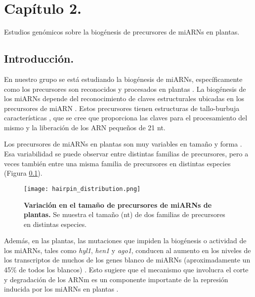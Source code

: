 
\graphicspath{{Chapter2/Figs/}}

\setcounter{chapter}{5}
\chapter*{Capítulo 2.} 
\setcounter{figure}{0}
\setcounter{table}{0}
\setcounter{section}{0}

{\LARGE Estudios genómicos sobre la biogénesis de precursores de miARNs en plantas.}

\section{Introducción.}
En nuestro grupo se está estudiando la biogénesis de miARNs, específicamente como los precursores son reconocidos y procesados en plantas \citep{Bologna2013}.
La biogénesis de los miARNs depende del reconocimiento de claves estructurales ubicadas en los precursores de miARN \citep{pmid21554756,citeulike:8816489,Bologna11112012}.
Estos precursores tienen estructuras de tallo-burbuja características \citep{Jones-Rhoades2006}, que se cree que proporciona las claves para el procesamiento del mismo y la liberación de los ARN pequeños de 21 nt.

Los precursores de miARNs en plantas son muy variables en tamaño y forma \citep{Bologna2013,citeulike:8816489}.
Esa variabilidad se puede observar entre distintas familias de precursores, pero a veces también entre una misma familia de precursores en distintas especies (Figura \ref{fig:hairpin_distribution}).

\begin{figure}[htbp!] 
    \centering    
    \texttt{[image: hairpin\_distribution.png]}
    \caption[Variación en el tamaño de precursores de miARNs de plantas]{
    \textbf{Variación en el tamaño de precursores de miARNs de plantas.} 
    Se muestra el tamaño (nt) de dos familias de precursores en distintas especies.}
    \label{fig:hairpin_distribution}
\end{figure}

Además, en las plantas, las mutaciones que impiden la biogénesis o actividad de los miARNs, tales como \textit{hyl1}, \textit{hen1} y \textit{ago1}, conducen al aumento en los niveles de los transcriptos de muchos de los genes blanco de miARNs (aproximadamente un 45\% de todos los blancos) \citep{Han2004,pmid12747833,pmid16889646,Allen2005207}.
Esto sugiere que el mecanismo que involucra el corte y degradación de los ARNm es un componente importante de la represión inducida por los miARNs en plantas \citep{Jones-Rhoades2006, Voinnet2009669}.

